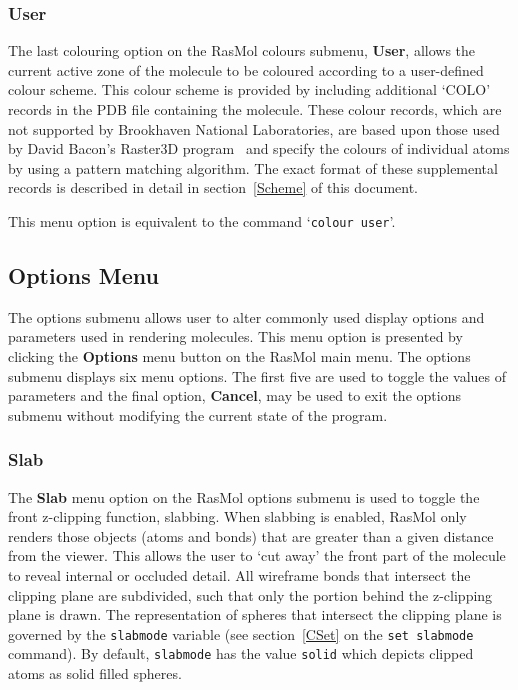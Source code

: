 \subsubsection{User}
\label{OUser}
The last colouring option on the RasMol colours submenu, {\bf User}, allows
the current active zone of the molecule to be coloured according to a 
user-defined colour scheme. This colour scheme is provided by including
additional `COLO' records in the PDB file containing the molecule. These
colour records, which are not supported by Brookhaven National Laboratories,
are based upon those used by David Bacon's Raster3D program~\cite{Bacon88b}
and specify the colours of individual atoms by using a pattern matching 
algorithm. The exact format of these supplemental records is described in 
detail in section~\ref{Scheme} of this document.

This menu option is equivalent to the command `{\tt colour user}'.


\subsection{Options Menu}
\label{OOptions}

The options submenu allows user to alter commonly used display options and
parameters used in rendering molecules. This menu option is presented by
clicking the {\bf Options} menu button on the RasMol main menu. The options
submenu displays six menu options. The first five are used to toggle the
values of parameters and the final option, {\bf Cancel}, may be used to
exit the options submenu without modifying the current state of the program.

\subsubsection{Slab}
\label{OSlab}
The {\bf Slab} menu option on the RasMol options submenu is used to toggle
the front z-clipping function, slabbing. When slabbing is enabled, RasMol
only renders those objects (atoms and bonds) that are greater than a given
distance from the viewer. This allows the user to `cut away' the front part
of the molecule to reveal internal or occluded detail. All wireframe bonds
that intersect the clipping plane are subdivided, such that only the portion
behind the z-clipping plane is drawn. The representation of spheres that
intersect the clipping plane is governed by the {\tt slabmode} variable
(see section~\ref{CSet} on the {\tt set~slabmode} command). By default, 
{\tt slabmode} has the value {\tt solid} which depicts clipped atoms as 
solid filled spheres.

